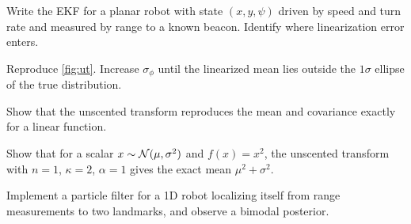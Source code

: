 \begin{exercises}
  \item Write the EKF for a planar robot with state $(x, y, \psi)$ driven by speed and turn rate and measured by range to a known beacon. Identify where
        linearization error enters.
  \item Reproduce \cref{fig:ut}. Increase $\sigma_\phi$ until the linearized mean lies outside the $1\sigma$ ellipse of the true distribution.
  \item Show that the unscented transform reproduces the mean and covariance exactly for a linear function.
  \item Show that for a scalar $x \sim \mathcal{N}(\mu, \sigma^2)$ and $f(x) = x^2$, the unscented transform with $n = 1$, $\kappa = 2$, $\alpha = 1$ gives the exact mean $\mu^2 + \sigma^2$.
  \item Implement a particle filter for a 1D robot localizing itself from range measurements to two landmarks, and observe a bimodal posterior.
\end{exercises}

